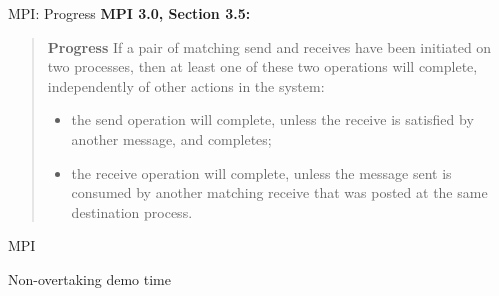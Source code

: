 \documentclass[english,compress]{beamer}
\begin{document}
\begin{frame}{MPI: Progress}
  \textbf{MPI 3.0, Section 3.5:}

  \begin{quote}
    \upshape
    \textbf{Progress} If a pair of matching send and receives have
    been initiated on two processes, then at least one of these two
    operations will complete, independently of other actions in the
    system:

    \begin{itemize}
      \item the send operation will complete, unless the receive is
        satisfied by another message, and completes;
      \item the receive operation will complete, unless the
        message sent is consumed by another matching receive that
        was posted at the same destination process.
    \end{itemize}
  \end{quote}
\end{frame}
\begin{frame}{MPI}
  \begin{center}
  \Huge Non-overtaking demo time
  \end{center}
\end{frame}
\end{document}
